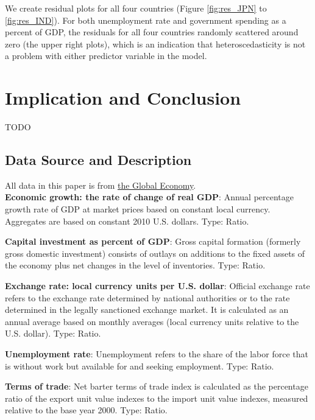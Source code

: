 \documentclass[11pt]{article}
\begin{document}
We create residual plots for all four countries (Figure \ref{fig:res_JPN} to \ref{fig:res_IND}). For both unemployment rate and government spending as a percent of GDP, the residuals for all four countries randomly scattered around zero (the upper right plots), which is an indication that heteroscedasticity is not a problem with either predictor variable in the model\citep{Residual1}.

\section{Implication and Conclusion}\label{conclusion}
TODO

\newpage



\begin{appendices}
\section{Data Source and Description}
All data in this paper is from \href{https://www.theglobaleconomy.com/download-data.php}{the Global Economy}.\\

\textbf{Economic growth: the rate of change of real GDP}: Annual percentage growth rate of GDP at market prices based on constant local currency. Aggregates are based on constant 2010 U.S. dollars. Type: Ratio.

\textbf{Capital investment as percent of GDP}: Gross capital formation (formerly gross domestic investment) consists of outlays on additions to the fixed assets of the economy plus net changes in the level of inventories. Type: Ratio.

\textbf{Exchange rate: local currency units per U.S. dollar}: Official exchange rate refers to the exchange rate determined by national authorities or to the rate determined in the legally sanctioned exchange market. It is calculated as an annual average based on monthly averages (local currency units relative to the U.S. dollar). Type: Ratio.

\textbf{Unemployment rate}: Unemployment refers to the share of the labor force that is without work but available for and seeking employment. Type: Ratio.

\textbf{Terms of trade}: Net barter terms of trade index is calculated as the percentage ratio of the export unit value indexes to the import unit value indexes, measured relative to the base year 2000. Type: Ratio.


\end{appendices}
\end{document}
